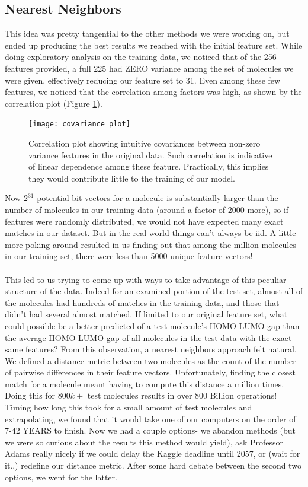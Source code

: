 \documentclass[letterpaper]{article}
\begin{document}
\subsection{Nearest Neighbors}
This idea was pretty tangential to the other methods we were working on, but ended up producing the best results we reached with the initial feature set. While doing exploratory analysis on the training data, we noticed that of the 256 features provided, a full 225 had ZERO variance among the set of molecules we were given, effectively reducing our feature set to 31. Even among these few features, we noticed that the correlation among factors was high, as shown by the correlation plot (Figure \ref{fig:correlation_plot}). 
\begin{center}
\begin{figure}[h!]
\texttt{[image: covariance\_plot]}
\caption{Correlation plot showing intuitive covariances between non-zero variance features in the original data. Such correlation is indicative of linear dependence among these feature. Practically, this implies they would contribute little to the training of our model.}
\label{fig:correlation_plot}
\end{figure}
\end{center}
Now $2^{31}$ potential bit vectors for a molecule is substantially larger than the number of molecules in our training data (around a factor of 2000 more), so if features were randomly distributed, we would not have expected many exact matches in our dataset. But in the real world things can't always be iid. A little more poking around resulted in us finding out that among the million molecules in our training set, there were less than 5000 unique feature vectors! \\
\\
This led to us trying to come up with ways to take advantage of this peculiar structure of the data. Indeed for an examined portion of the test set, almost all of the molecules had hundreds of matches in the training data, and those that didn't had several almost matched. If limited to our original feature set, what could possible be a better predicted of a test molecule's HOMO-LUMO gap than the average HOMO-LUMO gap of all molecules in the test data with the exact same features? From this observation, a nearest neighbors approach felt natural. We defined a distance metric between two molecules as the count of the number of pairwise differences in their feature vectors. Unfortunately, finding the closest match for a molecule meant having to compute this distance a million times. Doing this for $800k+$ test molecules results in over 800 Billion operations! Timing how long this took for a small amount of test molecules and extrapolating, we found that it would take one of our computers on the order of 7-42 YEARS to finish. Now we had a couple options- we abandon methods (but we were so curious about the results this method would yield), ask Professor Adams really nicely if we could delay the Kaggle deadline until 2057, or (wait for it..) redefine our distance metric. After some hard debate between the second two options, we went for the latter.\\
\end{document}
